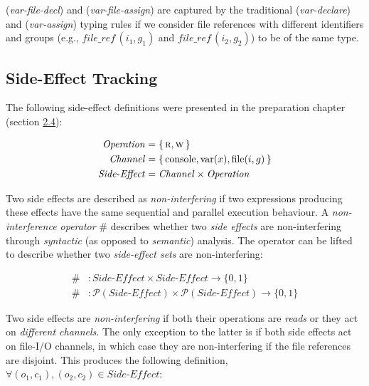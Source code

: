 (\emph{var-file-decl}) and (\emph{var-file-assign}) are captured by the traditional (\emph{var-declare}) and (\emph{var-assign}) typing rules if we consider file references with different identifiers and groups (e.g., \( \textit{file\_ref}\,(i_1, g_1) \) and \( \textit{file\_ref}\,(i_2, g_2) \)) to be of the same type.

\subsection{Side-Effect Tracking}

\label{sec:3.4.2}

The following side-effect definitions were presented in the preparation chapter (section \hyperref[sec:2.4]{2.4}):

\begin{align*}
  \mathit{Operation}          & = \{ \, \textsc{r}, \textsc{w} \, \}                                    \\
  \mathit{Channel}            & = \{ \, \text{console}, \text{var}(x), \text{file}(i, g) \, \} \\
  \mathit{Side\text{-}Effect} & = \mathit{Channel} \times \mathit{Operation}                            \\
\end{align*}

\vspace{-6mm}

Two side effects are described as \textit{non-interfering} if two expressions producing these effects have the same sequential and parallel execution behaviour. A \textit{non-interference operator} \( \# \) describes whether two \textit{side effects} are non-interfering through \textit{syntactic} (as opposed to \textit{semantic}) analysis. The operator can be lifted to describe whether two \textit{side-effect sets} are non-interfering:

\begin{align*}
  \# & : \mathit{Side\text{-}Effect} \times \mathit{Side\text{-}Effect} \rightarrow \{ 0, 1 \}                           \\
  \# & : \mathscr{P}(\mathit{Side\text{-}Effect}) \times \mathscr{P}(\mathit{Side\text{-}Effect}) \rightarrow \{ 0, 1 \}
\end{align*}

Two side effects are \textit{non-interfering} if both their operations are \textit{reads} or they act on \textit{different channels}. The only exception to the latter is if both side effects act on file-I/O channels, in which case they are non-interfering if the file references are disjoint. This produces the following definition, \( { \forall (o_1, c_1), (o_2, c_2) \in \mathit{Side\text{-}Effect} }\):

